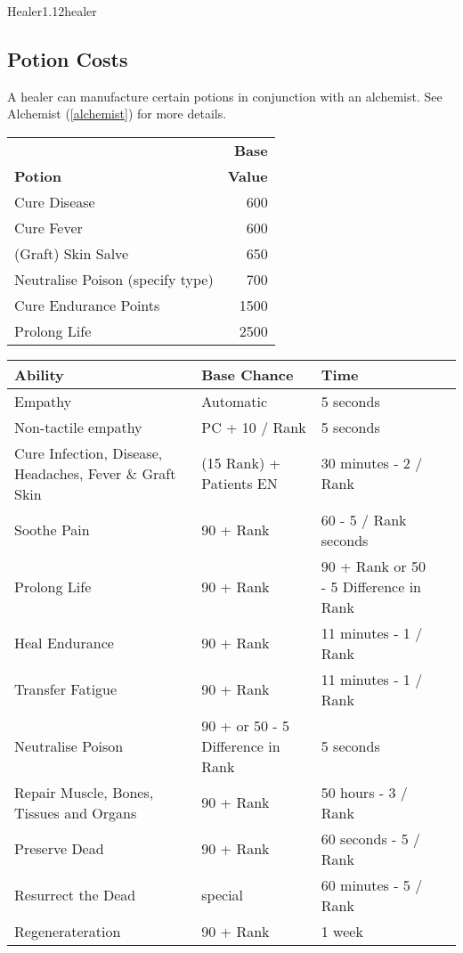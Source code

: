 \begin{skill*}{Healer}{1.12}{healer}
\subsection{Potion Costs}
\label{healer:potions}
A healer can manufacture certain potions in conjunction with an
alchemist. See Alchemist (\ref{alchemist}) for more details.

\begin{tabularx}{\linewidth}{Xr}
			& \textbf{Base} \\
\textbf{Potion}		& \textbf{Value} \\
Cure Disease		& 600 \\
Cure Fever		& 600 \\
(Graft) Skin Salve	& 650 \\
Neutralise Poison (specify type) & 700 \\
Cure Endurance Points	& 1500 \\
Prolong Life		& 2500 \\
\end{tabularx}
\end{skill*}

\begin{table*}[h]
\begin{center}
\begin{tabular}{|l|l|l|l|} \hline
\textbf{Ability}	& \textbf{Base Chance}	& \textbf{Time} \\ \hline
Empathy			& Automatic		& 5 seconds \\
Non-tactile empathy 	& PC + 10 / Rank	& 5 seconds \\
Cure Infection, Disease, Headaches, Fever \& Graft Skin	& (15 \x Rank) + Patients EN	& 30 minutes - 2 / Rank \\
Soothe Pain		& 90 + Rank	& 60 - 5 / Rank seconds \\
Prolong Life		& 90 + Rank	& 90 + Rank or 50 - 5 \x Difference in Rank \\
Heal Endurance		& 90 + Rank	& 11 minutes - 1 / Rank \\
Transfer Fatigue	& 90 + Rank	& 11 minutes - 1 / Rank \\
Neutralise Poison	& 90 + or 50 - 5 \x Difference in Rank	& 5 seconds \\
Repair Muscle, Bones, Tissues and Organs & 90 + Rank	& 50 hours - 3 / Rank \\
Preserve Dead 		& 90 + Rank	& 60 seconds - 5 / Rank \\
Resurrect the Dead	& special	& 60 minutes - 5 / Rank \\
Regenerateration	& 90 + Rank	& 1 week \\  \hline
\end{tabular}
\end{center}
\end{table*}
\newpage

